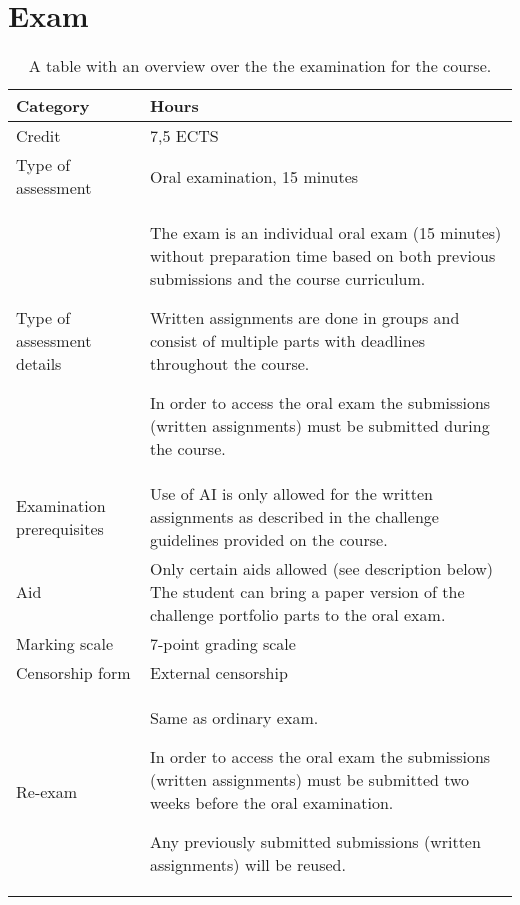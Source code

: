\section*{Exam}
\begin{table}[h]
    \centering
    \caption{A table with an overview over the the examination for the course.}
    \label{tab:exam_info}
    \begin{tabular}{ p{} | p{} }
        \textbf{Category} & \textbf{Hours} \\ 
        \hline
        Credit & 7,5 ECTS \\ 

        Type of assessment & Oral examination, 15 minutes \\

        Type of assessment details & The exam is an individual oral exam (15 minutes) without preparation time based on both previous submissions and the course curriculum.

        Written assignments are done in groups and consist of multiple
        parts with deadlines throughout the course.
        
        In order to access the oral exam the submissions (written assignments) must be submitted during the course. \\ 

        Examination prerequisites & Use of AI is only allowed for the written assignments as described in the challenge guidelines provided on the course.  \\

        Aid & Only certain aids allowed (see description below)
        The student can bring a paper version of the challenge portfolio parts to the oral exam. \\

        Marking scale & 
        7-point grading scale \\ 

        Censorship form & External censorship \\
        
        Re-exam & Same as ordinary exam.

        In order to access the oral exam the submissions (written assignments) must be submitted two weeks before the oral examination.
        
        Any previously submitted submissions (written assignments) will be reused. \\
    \end{tabular}
\end{table}



\newpage